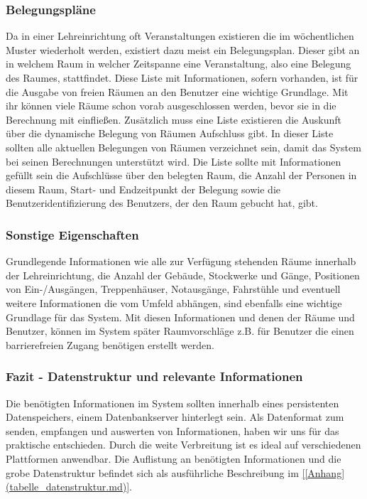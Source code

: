 \subsubsection{Belegungspläne}
\label{sec:Belegungspläne}

Da in einer Lehreinrichtung oft Veranstaltungen existieren die im wöchentlichen
Muster wiederholt werden, existiert dazu meist ein Belegungsplan. Dieser gibt
an in welchem Raum in welcher Zeitspanne eine Veranstaltung, also eine Belegung
des Raumes, stattfindet. Diese Liste mit Informationen, sofern vorhanden, ist
für die Ausgabe von freien Räumen an den Benutzer eine wichtige Grundlage.
Mit ihr können viele Räume schon vorab ausgeschlossen werden, bevor sie in die
Berechnung mit einfließen. Zusätzlich muss eine Liste existieren die Auskunft
über die dynamische Belegung von Räumen Aufschluss gibt. In dieser Liste
sollten alle aktuellen Belegungen von Räumen verzeichnet sein, damit das System
bei seinen Berechnungen unterstützt wird. Die Liste sollte mit Informationen
gefüllt sein die Aufschlüsse über den belegten Raum, die Anzahl der Personen in
diesem Raum, Start- und Endzeitpunkt der Belegung sowie die
Benutzeridentifizierung des Benutzers, der den Raum gebucht hat, gibt.

\subsubsection{Sonstige Eigenschaften}
\label{sec:Sonstige Eigenschaften}

Grundlegende Informationen wie alle zur Verfügung stehenden Räume innerhalb der
Lehreinrichtung, die Anzahl der Gebäude, Stockwerke und Gänge, Positionen von
Ein-/Ausgängen, Treppenhäuser, Notausgänge, Fahrstühle und eventuell weitere
Informationen die vom Umfeld abhängen, sind ebenfalls eine wichtige Grundlage
für das System. Mit diesen Informationen und denen der Räume und Benutzer,
können im System später Raumvorschläge z.B. für Benutzer die einen
barrierefreien Zugang benötigen erstellt werden.

\subsubsection{Fazit - Datenstruktur und relevante Informationen}
\label{sec:Fazit - Datenstruktur und relevante Informationen}

Die benötigten Informationen im System sollten innerhalb eines persistenten
Datenspeichers, \bspw einem Datenbankserver hinterlegt sein. Als Datenformat
zum senden, empfangen und auswerten von Informationen, haben wir uns für das
praktische \citep{[JSON]()} entschieden. Durch die weite Verbreitung ist es ideal auf
verschiedenen Plattformen anwendbar. Die Auflistung an benötigten
Informationen und die grobe Datenstruktur befindet sich als ausführliche
Beschreibung im \ref{[Anhang](tabelle_datenstruktur.md)}.


